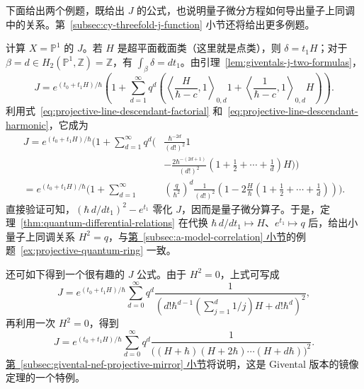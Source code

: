 下面给出两个例题，既给出 $J$ 的公式，也说明量子微分方程如何导出量子上同调中的关系。第~\ref{subsec:cy-threefold-j-function} 小节还将给出更多例题。
\begin{example}\label{ex:projective-line-j-function}
计算 $X=\mathbb P^1$ 的 $J$。若 $H$ 是超平面截面类（这里就是点类），则 $\delta=t_1H$；对于 $\beta=d\in H_2(\mathbb P^1,\mathbb Z)=\mathbb Z$，有 $\int_\beta\delta=dt_1$。由引理~\ref{lem:giventals-j-two-formulas}，
\[
J=e^{(t_0+t_1H)/\hbar}\left(1+\sum_{d=1}^{\infty}q^d
\left(\left\langle\frac H{\hbar-c},1\right\rangle_{0,d}1
+\left\langle\frac1{\hbar-c},1\right\rangle_{0,d}H\right)\right).
\]
利用式~\eqref{eq:projective-line-descendant-factorial} 和~\eqref{eq:projective-line-descendant-harmonic}，它成为
\[
\begin{aligned}
J=e^{(t_0+t_1H)/\hbar}\biggl(1+\sum_{d=1}^{\infty}q^d\biggl(&
\frac{\hbar^{-2d}}{(d!)^2}1\\
&-\frac{2\hbar^{-(2d+1)}}{(d!)^2}
\left(1+\frac12+\cdots+\frac1d\right)H\biggr)\biggr)\\
=e^{(t_0+t_1H)/\hbar}\biggl(1+\sum_{d=1}^{\infty}
&\left(\frac q{\hbar^2}\right)^d\frac1{(d!)^2}
\left(1-2\frac H\hbar\left(1+\frac12+\cdots+\frac1d\right)\right)\biggr).
\end{aligned}
\]
直接验证可知，$(\hbar\,d/dt_1)^2-e^{t_1}$ 零化 $J$，因而是量子微分算子。于是，定理~\ref{thm:quantum-differential-relations} 在代换 $\hbar\,d/dt_1\mapsto H$、$e^{t_1}\mapsto q$ 后，给出小量子上同调关系 $H^2=q$，与\hyperref[subsec:a-model-correlation]{第~\ref*{subsec:a-model-correlation} 小节}的例题~\ref{ex:projective-quantum-ring} 一致。

还可如下得到一个很有趣的 $J$ 公式。由于 $H^2=0$，上式可写成
\[
J=e^{(t_0+t_1H)/\hbar}\sum_{d=0}^{\infty}q^d
\frac1{\left(d!\hbar^{d-1}\left(\sum_{j=1}^d1/j\right)H+d!\hbar^d\right)^2},
\]
再利用一次 $H^2=0$，得到
\[
J=e^{(t_0+t_1H)/\hbar}\sum_{d=0}^{\infty}q^d
\frac1{\bigl((H+\hbar)(H+2\hbar)\cdots(H+d\hbar)\bigr)^2}.
\]
\hyperref[subsec:givental-nef-projective-mirror]{第~\ref*{subsec:givental-nef-projective-mirror} 小节}将说明，这是 Givental 版本的镜像定理的一个特例。
\end{example}

